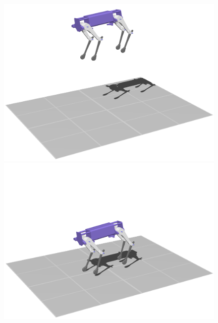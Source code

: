     \begin{figure}[h!]
    \centering
        \begin{minipage}{0.32\textwidth}
            \centering
            \includegraphics[width=\textwidth]{figures/lkgdrop_1_crop.png} %
        \end{minipage}
        \begin{minipage}{0.32\textwidth}
            \centering
            \includegraphics[width=\textwidth]{figures/lkgdrop_2_crop.png} %
        \end{minipage}
        \begin{minipage}{0.32\textwidth}

\end{minipage}
\end{figure}
